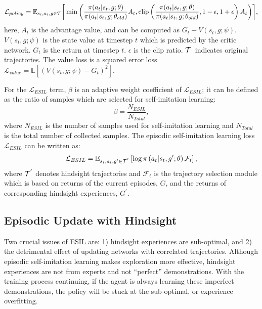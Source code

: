 \begin{equation}
  \centering
  \mathcal{L}_{policy} = \mathbb{E}_{s_{t}, a_{t}, g\in\Tau}\biggr[\min \left (\frac{\pi(a_{t}|s_{t}, g;\theta)}{\pi(a_{t}|s_{t}, g;\theta_{old})}A_{t}, \clip \left (\frac{\pi(a_{t}|s_{t}, g;\theta)}{\pi(a_{t}|s_{t}, g;\theta_{old})}, 1-\epsilon, 1+\epsilon \right )A_{t}\right )\biggr],
  \label{eq:policy_loss}
\end{equation}
here, $A_{t}$ is the advantage value, and can be computed as $G_{t} - V(s_{t}, g;\psi)$. $V(s_{t}, g;\psi)$ is the state value at timestep $t$ which is predicted by the critic network. $G_{t}$ is the return at timestep $t$. $\epsilon$ is the clip ratio. $\mathcal{T}$~indicates original trajectories. {The value loss is a squared error loss $\mathcal{L}_{value}=\mathbb{E}[(V(s_{t}, g;\psi) - G_{t})^{2}]$.}

For the $\mathcal{L}_{ESIL}$ term, $\beta$ is an adaptive weight coefficient of $\mathcal{L}_{ESIL}$; it can be defined as the ratio of samples which are selected for self-imitation learning:
\begin{equation}
  \beta=\frac{N_{ESIL}}{N_{Total}},
\end{equation}
where $N_{ESIL}$ is the number of samples used for self-imitation learning and $N_{Total}$ is the total number of collected samples.
The episodic self-imitation learning loss $\mathcal{L}_{ESIL}$ can be written as: 
\begin{equation}
  \centering
  \mathcal{L}_{ESIL}=\mathbb{E}_{s_{t}, a_{t}, g^\prime\in\Tau^{'}}\left[\log\pi\left(a_{t}|s_{t}, g^\prime;\theta\right)\mathcal{F}_t\right],
  \label{eq:imitaion}
\end{equation}
where $\mathcal{T}^{'}$ denotes hindsight trajectories and $\mathcal{F}_t$ is the trajectory selection module which is based on returns of the current episodes, $G$, and the returns of corresponding hindsight experiences, $G^{\prime}$.

\subsection{Episodic Update with Hindsight}
Two crucial issues of ESIL are: 1) hindsight experiences are sub-optimal, and 2) the {detrimental} effect of updating networks with correlated trajectories. 
Although episodic self-imitation learning makes exploration more effective, hindsight experiences are not from experts and not ``perfect'' demonstrations.  With the training process continuing, if the agent is always learning these imperfect demonstrations, the policy will be stuck at the sub-optimal, or experience overfitting.

